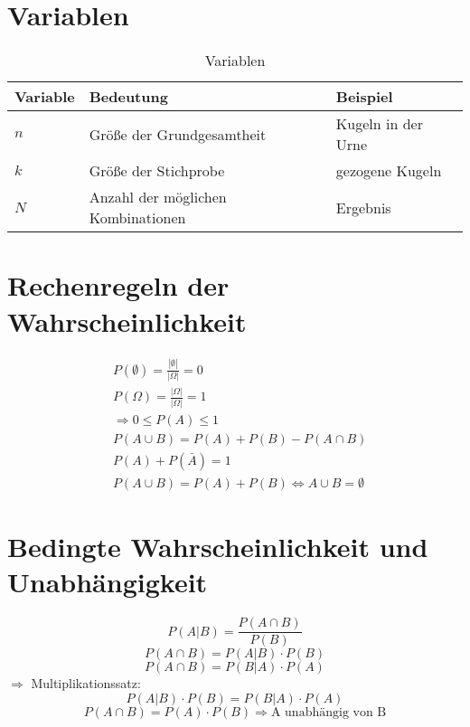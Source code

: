 \section{Variablen}
\begin{table}[h]
	\begin{tabular}{lll}
		Variable & Bedeutung & Beispiel\\
		\toprule
		$n$ & Größe der Grundgesamtheit & Kugeln in der Urne\\
		$k$ & Größe der Stichprobe & gezogene Kugeln\\
		$N$ & Anzahl der möglichen Kombinationen & Ergebnis
	\end{tabular}
	\caption{Variablen}
\end{table}

\section{Rechenregeln der Wahrscheinlichkeit}
\begin{align*}
	& P(\emptyset) = \frac{|\emptyset|}{|\Omega|}=0\\
	& P(\Omega) = \frac{|\Omega|}{|\Omega|}=1\\
	& \Rightarrow  0\leq P(A) \leq 1\\
	& P(A\cup B) = P(A)+P(B)-P(A\cap B)\\
	& P(A)+P(\bar{A}) =1\\
	& P(A\cup B) = P(A) + P(B) \Leftrightarrow A\cup B = \emptyset
\end{align*}

\section{Bedingte Wahrscheinlichkeit und Unabhängigkeit}
\begin{equation}
	P(A|B) = \frac{P(A\cap B)}{P(B)}
\end{equation}
\begin{equation}
	P(A\cap B)=P(A|B)\cdot P(B)
\end{equation}
\begin{equation}
	P(A\cap B)=P(B|A)\cdot P(A)
\end{equation}
$\Rightarrow$ Multiplikationssatz:
\begin{equation}
	P(A|B)\cdot P(B) = P(B|A)\cdot P(A)
\end{equation}
\begin{equation}
	P(A\cap B) = P(A)\cdot P(B) \Rightarrow \text{A unabhängig von B}
\end{equation}

